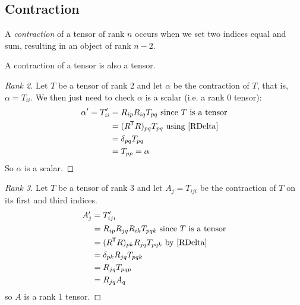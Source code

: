 \documentclass[../main.tex]{subfiles}
\begin{document}
\subsection{Contraction}
\begin{definition}[Contraction]
  A \textit{contraction} of a tensor of rank $n$ occurs when we set two indices equal and sum, resulting in an object of rank $n - 2$.
\end{definition}
\begin{lemma}
  A contraction of a tensor is also a tensor. \label{contractionTensor}
\end{lemma}
\begin{proof}[Rank 2]
  Let $T$ be a tensor of rank 2 and let $\alpha$ be the contraction of $T$, that is, $\alpha = T_{i i}$.
  We then just need to check $\alpha$ is a scalar (i.e. a rank 0 tensor):
  \begin{align*}
    \alpha' = T_{i i}' &= R_{i p}R_{i q}T_{p q} \text{ since $T$ is a tensor} \\
                       &= (R^{\trans} R)_{p q}T_{p q} \text{ using \cref{RDelta}} \\
                       &= \delta_{p q}T_{p q} \\
                       &= T_{p p} = \alpha
  \end{align*}
  So $\alpha$ is a scalar.
\end{proof}
\begin{proof}[Rank 3]
  Let $T$ be a tensor of rank 3 and let $A_{j} = T_{i j i}$ be the contraction of $T$ on its first and third indices.
  \begin{align*}
    A_{j}' &= T_{i j i}' \\
             &= R_{i p}R_{j q}R_{i k} T_{pqk} \text{ since $T$ is a tensor} \\
             &= (R^{\trans} R)_{p k} R_{j q} T_{pqk} \text{ by \cref{RDelta}} \\
             &= \delta_{p k} R_{j q}T_{pqk} \\
             &= R_{j q}T_{pqp} \\
             &= R_{j q}A_{q}
  \end{align*}
  so $A$ is a rank 1 tensor.
\end{proof}
\end{document}
